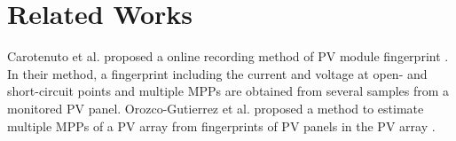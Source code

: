 \documentclass[conference]{IEEEtran}
\begin{document}


\section{Related Works}
Carotenuto et al. proposed a online recording method of PV module fingerprint \cite{b6}. In their method, a fingerprint including the current and voltage at open- and short-circuit points and multiple MPPs are obtained from several samples from a monitored PV panel. Orozco-Gutierrez et al. proposed a method to estimate multiple MPPs of a PV array from fingerprints of PV panels in the PV array \cite{b7}.
\end{document}
